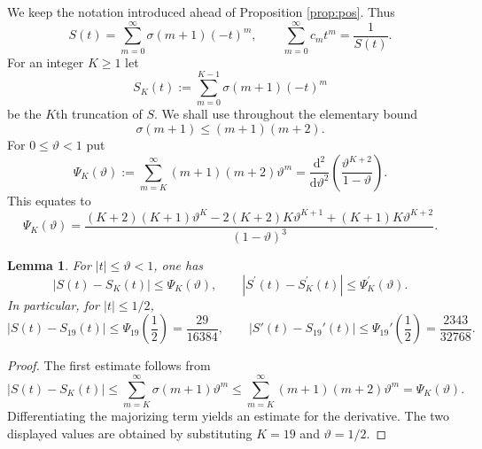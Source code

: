 \documentclass[11pt,reqno]{amsart}
\theoremstyle{plain}
\newtheorem{lemma}[theorem]{Lemma}
\theoremstyle{remark}
\theoremstyle{definition}
\numberwithin{equation}{section}
\newcommand{\zerlegung}{K}
\begin{document}
We keep the notation introduced
ahead of Proposition \ref{prop:pos}. Thus
\[
        S(t)=\sum_{m=0}^{\infty}\sigma(m+1)(-t)^m,
        \qquad
        \sum_{m=0}^{\infty}c_m t^m=\frac{1}{S(t)} .
\]
For an integer $\zerlegung
\geq 1$ let
\[
        S_{\zerlegung }\left( t\right) :=\sum_{m=0}
        ^{\zerlegung
        -1}\sigma(m+1)(-t)^m
\]
be the $\zerlegung
$th truncation of $S$. We shall use throughout the elementary bound
\[
        \sigma(m+1)\leq (m+1)(m+2).
\]
For $0\leq \vartheta
<1$ put
\[
        \Psi _{\zerlegung }
        \left( \vartheta
        \right) :=
        \sum_{m=\zerlegung
        }^{\infty}(m+1)(m+2)\vartheta
        ^m
        =\frac{\mathrm{d}^2}{\mathrm{d}\vartheta
        ^2}\left(\frac{\vartheta
        ^{\zerlegung
        +2}}{1-\vartheta
        }\right).
\]
This equates to
\[
        \Psi _{\zerlegung }\left(
        \vartheta
        \right) =
        \frac{\left( \zerlegung +2\right)
        \left( \zerlegung +1\right) \vartheta
        ^{\zerlegung }-2\left( \zerlegung +2\right)
        \zerlegung \vartheta
        ^{\zerlegung +1}+\left( \zerlegung +1\right)
        \zerlegung \vartheta
        ^{\zerlegung +2}}
             {(1-\vartheta
             )^3}.
\]

\begin{lemma}\label{lem:tail-estimates}
For $|t|\leq \vartheta
<1$, one has
\begin{equation}\label{eq:tail-estimates}
        \left| S(t)-S_{\zerlegung }\left( t\right)
        \right| \leq \Psi _{\zerlegung }\left( \vartheta
        \right) ,
        \qquad
        \left| S^{\prime }\left( t\right) -S_{\zerlegung
        }^{\prime }\left( t\right) \right| \leq \Psi
        _{\zerlegung }^{\prime }\left( \vartheta
        \right) .
\end{equation}
In particular, for $|t|\leq 1/2$,
\begin{equation}\label{eq:tail-estimates-19}
        |S(t)-S_{19}(t)|\leq \Psi_{19}\!\left(\frac12\right)=\frac{29}{16384},
        \qquad
        |S'(t)-S_{19}'(t)|\leq \Psi_{19}'\!\left(\frac12\right)=\frac{2343}{32768}.
\end{equation}
\end{lemma}

\begin{proof}
The first estimate follows from
\[
 \left| S\left( t\right)
 -S_{\zerlegung }\left( t\right) \right|
 \leq \sum_{m=\zerlegung
 }^{\infty}\sigma(m+1)\vartheta
 ^m
 \leq \sum_{m=\zerlegung
 }^{\infty}(m+1)(m+2)\vartheta
 ^m=\Psi _{\zerlegung }\left( \vartheta
 \right) .
\]
Differentiating the majorizing term yields
an estimate for the derivative. The two displayed
values are obtained by substituting $\zerlegung =19$ and $\vartheta
=1/2$.
\end{proof}
\end{document}
